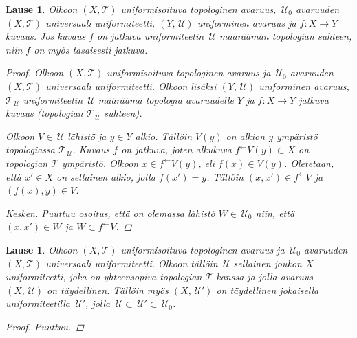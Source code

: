 \documentclass[12pt,a4paper,leqno]{report}
\newcommand{\U}{\,\mathcal{U}}
\newcommand{\T}{\mathcal{T}}
\theoremstyle{plain}
\newtheorem{lause}[equation]{Lause}
\theoremstyle{definition}
\theoremstyle{remark}
\begin{document}
\begin{lause}
Olkoon $(X,\T)$ uniformisoituva topologinen avaruus, 
$\U_0$ avaruuden $(X,\T)$ universaali uniformiteetti, 
$(Y,\U)$ uniforminen avaruus ja $f\colon X\rightarrow Y$ 
kuvaus. 
Jos kuvaus $f$ on jatkuva uniformiteetin $\U$ määräämän topologian suhteen, %
niin $f$ on myös tasaisesti jatkuva. %
\begin{proof}
Olkoon $(X,\T)$ uniformisoituva topologinen avaruus ja 
$\U_0$ avaruuden $(X,\T)$ universaali uniformiteetti. 
Olkoon lisäksi $(Y,\U)$ uniforminen avaruus, $\T_{\U}$ uniformiteetin $\U$ määräämä topologia avaruudelle $Y$ ja $f\colon X\rightarrow Y$ 
jatkuva kuvaus (topologian $\T_{\U}$ suhteen). 

Olkoon $V\in \U$ lähistö ja $y\in Y$ alkio. 
Tällöin $V(y)$ on alkion $y$ ympäristö topologiassa $\T_{\U}$. 
Kuvaus $f$ on jatkuva, 
joten alkukuva $f^\leftarrow V(y)\subset X$ on topologian $\T$ ympäristö. 
Olkoon $x\in f^\leftarrow V(y)$, eli $f(x)\in V(y)$. 
Oletetaan, että $x'\in X$ on sellainen alkio, jolla $f(x')= y$.
Tällöin $(x,x')\in f^\leftarrow V$ 
ja $(f(x),y)\in V$. 


Kesken. Puuttuu osoitus, että on olemassa lähistö $W\in\U_0$ niin, että $(x,x')\in W$ ja $W\subset f^\leftarrow V$.


\end{proof}
\end{lause}
\begin{lause}
Olkoon $(X,\T)$ uniformisoituva topologinen avaruus ja 
$\U_0$ avaruuden $(X,\T)$ universaali uniformiteetti. 
Olkoon tällöin  
$\U$ sellainen joukon $X$ uniformiteetti, 
joka on yhteensopiva topologian $\T$ kanssa ja 
jolla avaruus $(X,\U)$ on täydellinen. 
Tällöin myös $(X,\U')$ on täydellinen jokaisella 
uniformiteetilla $\U'$, jolla 
$\U\subset\U'\subset\U_0$.
\begin{proof}
Puuttuu.
\end{proof}
\end{lause}
%
%
\end{document}
